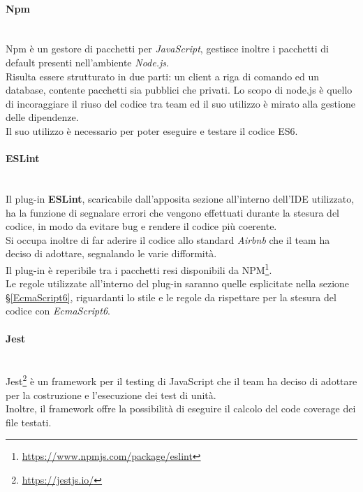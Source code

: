 \paragraph{Npm}\-\\
Npm è un gestore di pacchetti per \textit{JavaScript}, gestisce inoltre i pacchetti di default presenti nell'ambiente \textit{Node.js}.\\
Risulta essere strutturato in due parti: un client a riga di comando ed un database, contente pacchetti sia pubblici che privati. Lo scopo di node.js è quello di incoraggiare il riuso del codice tra team ed il suo utilizzo è mirato alla gestione delle dipendenze.\\ 
Il suo utilizzo è necessario per poter eseguire e testare il codice ES6.

\paragraph{ESLint}\-\\
Il plug-in \textbf{ESLint}, scaricabile dall'apposita sezione all'interno dell'IDE utilizzato, ha la funzione di segnalare errori che vengono effettuati durante la stesura del codice, in modo da evitare bug e rendere il codice più coerente. \\ 
Si occupa inoltre di far aderire il codice allo standard \textit{Airbnb} che il team ha deciso di adottare, segnalando le varie difformità.\\
Il plug-in è reperibile tra i pacchetti resi disponibili da NPM\footnote{\url{https://www.npmjs.com/package/eslint}}.\\
Le regole utilizzate all'interno del plug-in saranno quelle esplicitate nella sezione §\ref{EcmaScript6}, riguardanti lo stile e le regole da rispettare per la stesura del codice con \textit{EcmaScript6}.

\paragraph{Jest}\-\\
Jest\footnote{\url{https://jestjs.io/}} è un framework per il testing di JavaScript che il team ha deciso di adottare per la costruzione e l'esecuzione dei test di unità.\\
Inoltre, il framework offre la possibilità di eseguire il calcolo del code coverage dei file testati.




